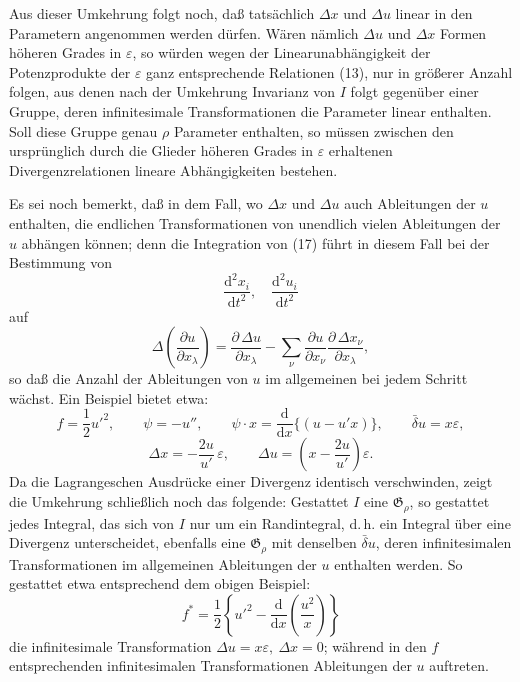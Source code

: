 \documentclass[11pt]{article}
\newcommand{\D}{\Delta}
\providecommand{\eps}{\varepsilon}
\providecommand{\dd}{\mathrm d}
\providecommand{\G}{\mathfrak G}
\providecommand{\bd}{\bar{\delta}}
\providecommand{\p}{\partial}
\providecommand{\p}{\partial}
\providecommand{\dd}{\mathrm d}
\begin{document}
Aus dieser Umkehrung folgt noch, daß tatsächlich \(\D x\) und \(\D u\) linear in den Parametern angenommen werden dürfen. Wären nämlich \(\D u\) und \(\D x\) Formen höheren Grades in \(\eps\), so würden wegen der Linearunabhängigkeit der Potenzprodukte der \(\eps\) ganz entsprechende Relationen (13), nur in größerer Anzahl folgen, aus denen nach der Umkehrung Invarianz von \(I\) folgt gegenüber einer Gruppe, deren infinitesimale Transformationen die Parameter linear enthalten. Soll diese Gruppe genau \(\rho\) Parameter enthalten, so müssen zwischen den ursprünglich durch die Glieder höheren Grades in \(\eps\) erhaltenen Divergenzrelationen lineare Abhängigkeiten bestehen.

Es sei noch bemerkt, daß in dem Fall, wo \(\D x\) und \(\D u\) auch Ableitungen der \(u\) enthalten, die endlichen Transformationen von unendlich vielen Ableitungen der \(u\) abhängen können; denn die Integration von (17) führt in diesem Fall bei der Bestimmung von
\[
\frac{\dd^2x_i}{\dd t^2},\quad \frac{\dd^2u_i}{\dd t^2}
\]
auf
\[
\D\!\left(\frac{\p u}{\p x_\lambda}\right)
=\frac{\p\,\D u}{\p x_\lambda}
-\sum_\nu\frac{\p u}{\p x_\nu}
\frac{\p\,\D x_\nu}{\p x_\lambda},
\]
so daß die Anzahl der Ableitungen von \(u\) im allgemeinen bei jedem Schritt wächst. Ein Beispiel bietet etwa:
\[
f=\frac12 u'^2,\qquad
\psi=-u'',\qquad
\psi\cdot x=\frac{\dd}{\dd x}\{(u-u'x)\},\qquad
\bd u=x\eps,
\]
\[
\D x=-\frac{2u}{u'}\,\eps,\qquad
\D u=\left(x-\frac{2u}{u'}\right)\eps.
\]
Da die Lagrangeschen Ausdrücke einer Divergenz identisch verschwinden, zeigt die Umkehrung schließlich noch das folgende: Gestattet \(I\) eine \(\G_\rho\), so gestattet jedes Integral, das sich von \(I\) nur um ein Randintegral, d.\,h. ein Integral über eine Divergenz unterscheidet, ebenfalls eine \(\G_\rho\) mit denselben \(\bd u\), deren infinitesimalen Transformationen im allgemeinen Ableitungen der \(u\) enthalten werden. So gestattet etwa entsprechend dem obigen Beispiel:
\[
f^*=\frac12\left\{u'^2-\frac{\dd}{\dd x}\left(\frac{u^2}{x}\right)\right\}
\]
die infinitesimale Transformation \(\D u=x\eps,\ \D x=0\); während in den \(f\) entsprechenden infinitesimalen Transformationen Ableitungen der \(u\) auftreten.
\end{document}
